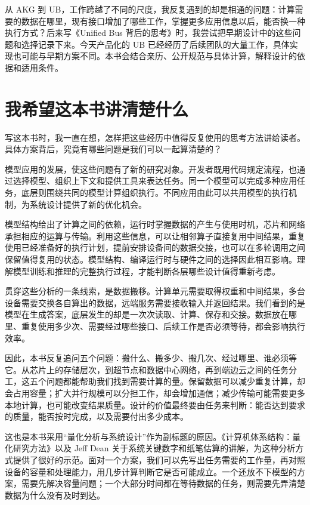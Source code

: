 从 AKG 到
UB，工作跨越了不同的尺度，我反复遇到的却是相通的问题：计算需要的数据在哪里，现有接口增加了哪些工作，掌握更多应用信息以后，能否换一种执行方式？后来写《Unified
Bus
背后的思考》时，我尝试把早期设计中的这些问题和选择记录下来。今天产品化的
UB
已经经历了后续团队的大量工作，具体实现也可能与早期方案不同。本书会结合亲历、公开规范与具体计算，解释设计的依据和适用条件。

\section*{我希望这本书讲清楚什么}\label{ux6211ux5e0cux671bux8fd9ux672cux4e66ux8bb2ux6e05ux695aux4ec0ux4e48}

写这本书时，我一直在想，怎样把这些经历中值得反复使用的思考方法讲给读者。具体方案背后，究竟有哪些问题是我们可以一起算清楚的？

模型应用的发展，使这些问题有了新的研究对象。开发者既用代码规定流程，也通过选择模型、组织上下文和提供工具来表达任务。同一个模型可以完成多种应用任务，底层则围绕共同的模型计算组织执行。不同应用由此可以共用模型的执行机制，为系统设计提供了新的优化机会。

模型结构给出了计算之间的依赖，运行时掌握数据的产生与使用时机，芯片和网络承担相应的运算与传输。利用这些信息，可以让相邻算子直接复用中间结果，重复使用已经准备好的执行计划，提前安排设备间的数据交接，也可以在多轮调用之间保留值得复用的状态。模型结构、编译运行时与硬件之间的选择因此相互影响。理解模型训练和推理的完整执行过程，才能判断各层哪些设计值得重新考虑。

贯穿这些分析的一条线索，是数据搬移。计算单元需要取得权重和中间结果，多台设备需要交换各自算出的数据，远端服务需要接收输入并返回结果。我们看到的是模型在生成答案，底层发生的却是一次次读取、计算、保存和交接。数据放在哪里、重复使用多少次、需要经过哪些接口、后续工作是否必须等待，都会影响执行效率。

因此，本书反复追问五个问题：搬什么、搬多少、搬几次、经过哪里、谁必须等它。从芯片上的存储层次，到超节点和数据中心网络，再到端边云之间的任务分工，这五个问题都能帮助我们找到需要计算的量。保留数据可以减少重复计算，却会占用容量；扩大并行规模可以分担工作，却会增加通信；减少传输可能需要更多本地计算，也可能改变结果质量。设计的价值最终要由任务来判断：能否达到要求的质量，能否按时完成，以及需要付出多少成本。

这也是本书采用``量化分析与系统设计''作为副标题的原因。《计算机体系结构：量化研究方法》以及
Jeff Dean
关于系统关键数字和纸笔估算的讲解，为这种分析方式提供了很好的示范。面对一个方案，我们可以先写出任务需要的工作量，再对照设备的容量和处理能力，用几步计算判断它是否可能成立。一个还放不下模型的方案，需要先解决容量问题；一个大部分时间都在等待数据的任务，则需要先弄清楚数据为什么没有及时到达。

